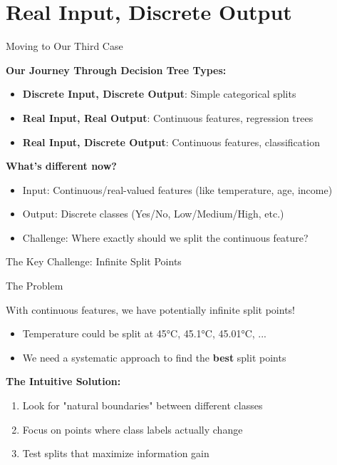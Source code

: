 \documentclass[usenames,dvipsnames]{beamer}
\begin{document}
\section{Real Input, Discrete Output}

\begin{frame}{Moving to Our Third Case}
\begin{keypointsbox}
    \scriptsize

\textbf{Our Journey Through Decision Tree Types:}
\begin{itemize}
\item \textbf{Discrete Input, Discrete Output}: Simple categorical splits
\item \textbf{Real Input, Real Output}: Continuous features, regression trees  
\item \textbf{Real Input, Discrete Output}: Continuous features, classification
\end{itemize}
\end{keypointsbox}

\vspace{0.3em}
\textbf{What's different now?}
\begin{itemize}
\item Input: Continuous/real-valued features (like temperature, age, income)
\item Output: Discrete classes (Yes/No, Low/Medium/High, etc.)
\item Challenge: Where exactly should we split the continuous feature?
\end{itemize}
\end{frame}

\begin{frame}{The Key Challenge: Infinite Split Points}
\begin{alertbox}{The Problem}
    \scriptsize

With continuous features, we have potentially infinite split points!
\begin{itemize}
\item Temperature could be split at 45°C, 45.1°C, 45.01°C, ...
\item We need a systematic approach to find the \textbf{best} split points
\end{itemize}
\end{alertbox}

\vspace{0.3em}
\textbf{The Intuitive Solution:}
\begin{enumerate}
\item Look for "natural boundaries" between different classes
\item Focus on points where class labels actually change  
\item Test splits that maximize information gain
\end{enumerate}
\end{frame}
\end{document}
